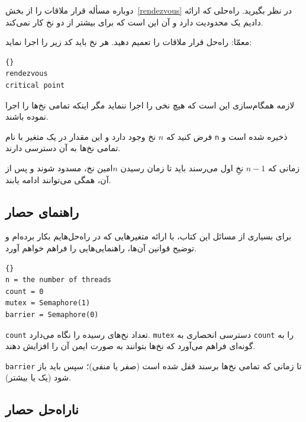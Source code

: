 \documentclass{book}
\newcommand{\clearemptydoublepage}{}%
\begin{document}
    دوباره مسأله قرار ملاقات را از بخش~\ref{rendezvous} در نظر بگیرید. 
    راه‌حلی که ارائه دادیم یک محدودیت دارد و آن این است که برای بیشتر از دو نخ کار نمی‌کند. 

    معمّا: راه‌حل قرار ملاقات را تعمیم دهید. هر نخ باید کد زیر را اجرا نماید:
\begin{latin}
\begin{lstlisting}[title=\rl{ کد حصار}]{}
rendezvous
critical point
\end{lstlisting}
\end{latin}

    لازمه همگام‌سازی این است که هیچ نخی  را اجرا ننماید مگر اینکه تمامی نخ‌ها 
    را اجرا نموده باشند. 

    فرض کنید که $n$ نخ وجود دارد و این مقدار در یک متغیر با نام \texttt{n} ذخیره  شده است و تمامی نخ‌ها به آن دسترسی دارند. 

    زمانی که $n-1$ نخِ اول می‌رسند باید تا زمان رسیدن $n$‌امین نخ، مسدود شوند و پس از آن، همگی می‌توانند ادامه یابند. 


\clearemptydoublepage
\subsection {راهنمای حصار}


    برای بسیاری از مسائل این کتاب، با ارائه متغیرهایی که در راه‌حل‌هایم  بکار برده‌ام و توضیح قوانین آن‌ها، راهنمایی‌هایی را فراهم خواهم آورد. 

\begin{latin}
\begin{lstlisting}[title=\rl{راهنمای حصار}]{}
n = the number of threads
count = 0
mutex = Semaphore(1)
barrier = Semaphore(0)
\end{lstlisting}
\end{latin}

    \texttt{count} تعداد نخ‌های رسیده را نگاه می‌دارد. 
    \texttt{mutex} دسترسی انحصاری به \texttt{count} را 
    به گونه‌ای فراهم می‌آورد که نخ‌ها بتوانند به صورت ایمن آن را افزایش دهند. 

    \texttt{barrier}
    تا زمانی که تمامی نخ‌ها برسند قفل شده است (صفر یا منفی)؛ سپس باید باز شود (یک یا بیشتر). 

\clearemptydoublepage
\subsection 
{ناراه‌حل حصار}
\end{document}
